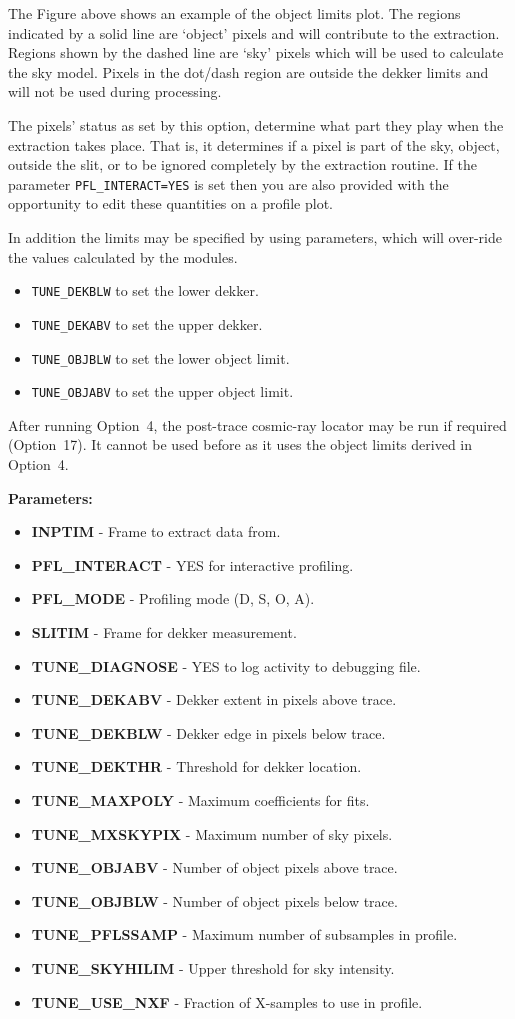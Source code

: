 \documentclass[11pt,twoside]{article}
\makeatletter
\newcommand{\htmlref}[2]{#1}
\newcommand{\sunspec}[2]{#1}
\renewcommand{\sunspec}[2]{#2}
\newcommand{\myindex}[1]{\index{#1}}
\newcommand{\indexcmdname}[1]{\index{#1@\protect\cmdname{#1}}}
\renewcommand{\myindex}[1]{}
\renewcommand{\indexcmdname}[1]{}
\newcommand{\cmdname}{\begingroup \catcode`\_=12 \realcmdname}
\newcommand{\realcmdname}[1]{\endgroup\texttt{#1}}
\newcommand{\echpars}[1]{
{\bf Parameters:\vspace*{6pt}\\}
    #1
}
\renewcommand{\echpars}[1]{
{\bf Parameters:}
\begin{itemize}
#1
\end{itemize}
}
\newcommand{\epar}[3]
{
    \hspace*{5mm}\makebox[50mm][l]{\bf #1} #2 (p~\pageref{par_#3}.)\\
}
\renewcommand{\epar}[3]
{\item \htmlref{{\bf #1}}{par_#3} - #2}
\newcommand{\lepar}[3]
{
    \hspace*{5mm}\makebox[50mm][l]{\bf #1} #2 (p~\pageref{par_#3}.)
}
\renewcommand{\lepar}[3]
{\item \htmlref{{\bf #1}}{par_#3} - #2}
\makeatother
\begin{document}
\sunspec{Figure~\ref{fi_objlim}}{The Figure above}
shows an example of the object limits plot. The
regions indicated by a solid line are `object' pixels and will
contribute to the extraction. Regions shown by the dashed line are `sky'
pixels which will be used to calculate the sky model. Pixels in the
dot/dash region are outside the dekker limits and will not be used
during processing.

The pixels' status as set by this option, determine what part they play
when the extraction takes place. That is, it determines if a pixel is
part of the sky, object, outside the slit, or to be ignored completely
by the extraction routine. \indexcmdname{PFL_INTERACT} If the parameter
\htmlref{{\tt PFL\_INTERACT=YES}}{par_PFL_INTERACT} is set then you
are also provided with the opportunity to edit these quantities on a profile
plot.

In addition the limits may be specified by using parameters, which will
over-ride the values calculated by the modules. \myindex{Manual dekker
limits} \myindex{Manual object limits}

\begin{itemize}

\item {\texttt{TUNE\_DEKBLW} to set the lower dekker.}

\item {\texttt{TUNE\_DEKABV} to set the upper dekker.}

\item {\texttt{TUNE\_OBJBLW} to set the lower object limit.}

\item {\texttt{TUNE\_OBJABV} to set the upper object limit.}

\end{itemize}

\myindex{Cosmic rays!when to locate}
After running Option~4, the post-trace cosmic-ray locator may be run if
required (Option~17).  It cannot be used before as it uses the object
limits derived in Option~4.

\echpars{
\epar{INPTIM}{Frame to extract data from.}{INPTIM}
\epar{PFL\_INTERACT}{YES for interactive profiling.}{PFL_INTERACT}
\epar{PFL\_MODE}{Profiling mode (D, S, O, A).}{PFL_MODE}
\epar{SLITIM}{Frame for dekker measurement.}{SLITIM}
\epar{TUNE\_DIAGNOSE}{YES to log activity to debugging file.}{TUNE_DIAGNOSE}
\epar{TUNE\_DEKABV}{Dekker extent in pixels above trace.}{TUNE_DEKABV}
\epar{TUNE\_DEKBLW}{Dekker edge in pixels below trace.}{TUNE_DEKBLW}
\epar{TUNE\_DEKTHR}{Threshold for dekker location.}{TUNE_DEKTHR}
\epar{TUNE\_MAXPOLY}{Maximum coefficients for fits.}{TUNE_MAXPOLY}
\epar{TUNE\_MXSKYPIX}{Maximum number of sky pixels.}{TUNE_MXSKYPIX}
\epar{TUNE\_OBJABV}{Number of object pixels above trace.}{TUNE_OBJABV}
\epar{TUNE\_OBJBLW}{Number of object pixels below trace.}{TUNE_OBJBLW}
\epar{TUNE\_PFLSSAMP}{Maximum number of subsamples in profile.}{TUNE_PFLSSAMP}
\epar{TUNE\_SKYHILIM}{Upper threshold for sky intensity.}{TUNE_SKYHILIM}
\lepar{TUNE\_USE\_NXF}{Fraction of X-samples to use in profile.}{TUNE_USE_NXF}
}
\end{document}
